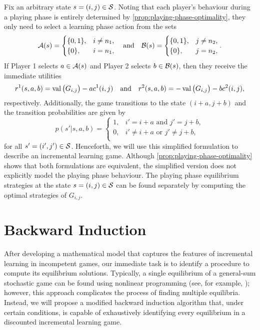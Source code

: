     Fix an arbitrary state $s = (i, j) \in \mathcal{S}$.
    Noting that each player's behaviour during a playing phase is entirely determined by \autoref{prop:playing-phase-optimality}, they only need to select a learning phase action from the sets
    \[
        \mathcal{A}(s)
            =
            \begin{cases}
                \{0, 1\}, & i \neq n_1, \\
                \{0\}, & i = n_1, \\
            \end{cases}
        \quad\text{and}\quad
        \mathcal{B}(s)
            =
            \begin{cases}
                \{0, 1\}, & j \neq n_2, \\
                \{0\}, & j = n_2, \\
            \end{cases}.
    \]
    If Player 1 selects  $a \in \mathcal{A}(s)$ and Player 2 selects $b \in \mathcal{B}(s)$, then they receive the immediate utilities
    \[
        r^1(s, a, b)
            = \operatorname{val}\big(G_{i, j}\big) - a c^1(i, j)
        \quad\text{and}\quad
        r^2(s, a, b)
            = -\operatorname{val}\big(G_{i, j}\big) - b c^2(i, j),
    \]
    respectively.
    Additionally, the game transitions to the state $(i + a, j + b)$ and the transition probabilities are given by
    \[
        p(s' | s, a, b)
            =
            \begin{cases}
                1, & i' = i + a \text{ and } j' = j + b, \\
                0, & i' \neq i + a \text{ or } j' \neq j + b, \\
            \end{cases}
    \]
    for all $s' = (i', j') \in \mathcal{S}$.
    Henceforth, we will use this simplified formulation to describe an incremental learning game.
    Although \autoref{prop:playing-phase-optimality} shows that both formulations are equivalent, the simplified version does not explicitly model the playing phase behaviour.
    The playing phase equilibrium strategies at the state $s = (i, j) \in \mathcal{S}$ can be found separately by computing the optimal strategies of $G_{i, j}$.



\section{Backward Induction} \label{sec:backward-induction}
    After developing a mathematical model that captures the features of incremental learning in incompetent games, our immediate task is to identify a procedure to compute its equilibrium solutions.
    Typically, a single equilibrium of a general-sum stochastic game can be found using nonlinear programming (see, for example, \parencite[Section 3.8]{Filar1997}); however, this approach complicates the process of finding multiple equilibria.
    Instead, we will propose a modified backward induction algorithm that, under certain conditions, is capable of exhaustively identifying every equilibrium in a discounted incremental learning game. 

